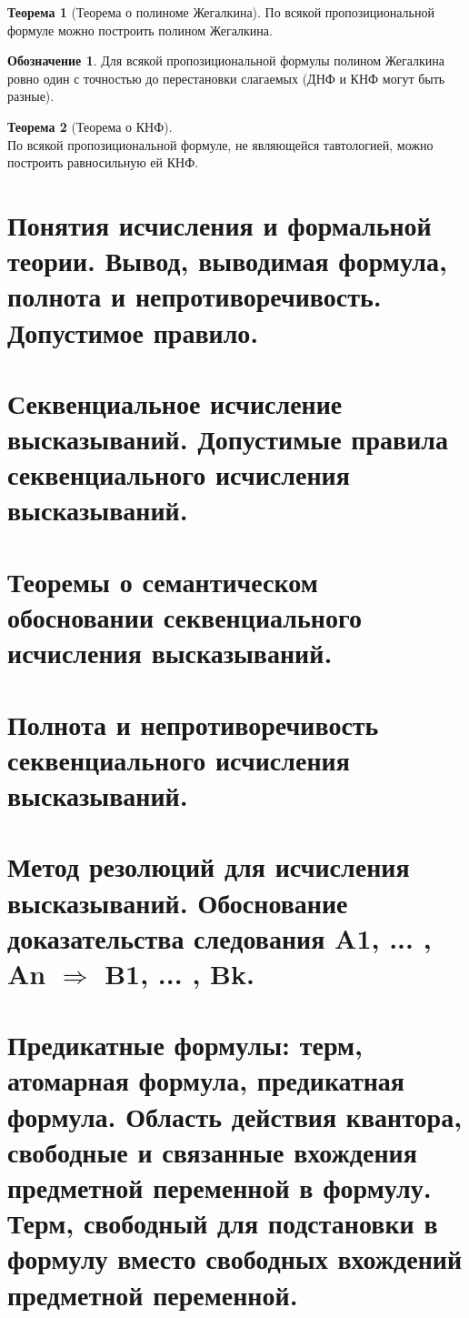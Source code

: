 \documentclass[a4paper,12pt]{article}
\theoremstyle{definition} %
\newtheorem{theorem}{Теорема}[section]
\newtheorem{notation}{Обозначение}[section]
\theoremstyle{definition} %
\theoremstyle{remark} %
\begin{document}
	\begin{theorem}[Теорема о полиноме Жегалкина]
		По всякой пропозициональной формуле можно построить полином Жегалкина.
	\end{theorem}

	\begin{notation}
		Для всякой пропозициональной формулы полином Жегалкина ровно один с точностью до перестановки слагаемых (ДНФ и КНФ могут быть разные).
	\end{notation}

	\begin{theorem}[Теорема о КНФ]\ \\[1ex]
		По всякой пропозициональной формуле, не являющейся тавтологией, можно построить равносильную ей КНФ.
	\end{theorem}

\section{Понятия исчисления и формальной теории. Вывод, выводимая формула, полнота и непротиворечивость. Допустимое правило.}

\section{Секвенциальное исчисление высказываний. Допустимые правила секвенциального исчисления высказываний.}

\section{Теоремы о семантическом обосновании секвенциального исчисления высказываний.}

\section{Полнота и непротиворечивость секвенциального исчисления высказываний.}

\section{Метод резолюций для исчисления высказываний. Обоснование доказательства следования A1, ... , An $\Rightarrow$ B1, ... , Bk.}

\newpage

\section{Предикатные формулы: терм, атомарная формула, предикатная формула. Область действия квантора, свободные и связанные вхождения предметной переменной в формулу. Терм, свободный для подстановки в формулу вместо свободных вхождений предметной переменной.}
\end{document}
